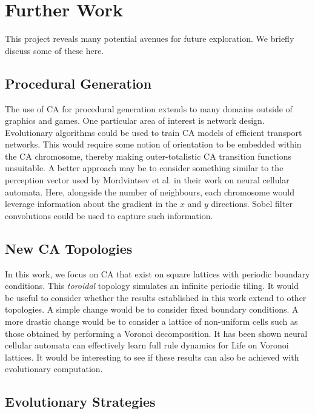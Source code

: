 \section{Further Work}

This project reveals many potential avenues for future exploration. We briefly discuss some of these here.

\subsection{Procedural Generation}

The use of CA for procedural generation extends to many domains outside of graphics and games. One particular area of interest is network design. Evolutionary algorithms could be used to train CA models of efficient transport networks. This would require some notion of orientation to be embedded within the CA chromosome, thereby making outer-totalistic CA transition functions unsuitable. A better approach may be to consider something similar to the perception vector used by Mordvintsev et al.\cite{mordvintsev2020growing} in their work on neural cellular automata. Here, alongside the number of neighbours, each chromosome would leverage information about the gradient in the $x$ and $y$ directions. Sobel filter convolutions could be used to capture such information.

\subsection{New CA Topologies}

In this work, we focus on CA that exist on square lattices with periodic boundary conditions. This \textit{toroidal} topology simulates an infinite periodic tiling. It would be useful to consider whether the results established in this work extend to other topologies. A simple change would be to consider fixed boundary conditions. A more drastic change would be to consider a lattice of non-uniform cells such as those obtained by performing a Voronoi decomposition. It has been shown neural cellular automata can effectively learn full rule dynamics for Life on Voronoi lattices\cite{grattarola2021learning}. It would be interesting to see if these results can also be achieved with evolutionary computation.

\subsection{Evolutionary Strategies}

